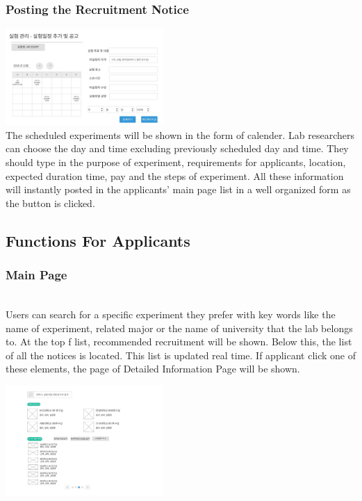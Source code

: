 \documentclass[letterpaper, 10 pt, conference]{ieeeconf}  %
\begin{document}
\subsubsection{Posting the Recruitment Notice}
\includegraphics[width=6cm]{Oven/10_ScheduleNotice.jpg}
\\The scheduled experiments will be shown in the form of calender. Lab researchers can choose the day and time excluding previously scheduled day and time. They should type in the purpose of experiment, requirements for applicants, location, expected duration time, pay and the steps of experiment. All these information will instantly posted in the applicants' main page list in a well organized form as the button is clicked. 

\subsection{Functions For Applicants}
\subsubsection{Main Page\\}
\\Users can search for a specific experiment they prefer with key words like the name of experiment, related major or the name of university that the lab belongs to. At the top f list, recommended recruitment will be shown. Below this, the list of all the notices is located. This list is updated real time. If applicant click one of these elements, the page of Detailed Information Page will be shown. 

\includegraphics[width=6cm]{Oven/11_applicantMainpage.jpg}
\end{document}
